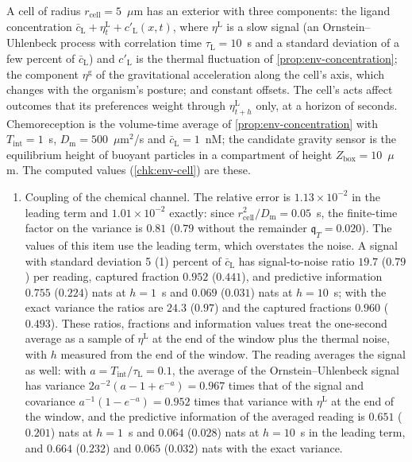 \begin{example}\label{ex:env-cell}
A cell of radius $r_{\mathrm{cell}}=5$~$\mu$m has an exterior with three components: the ligand concentration $\bar c_{\mathrm L}+\eta^{\mathrm L}_t+c'_{\mathrm L}(x,t)$, where $\eta^{\mathrm L}$ is a slow signal (an Ornstein--Uhlenbeck process with correlation time $\tau_{\mathrm L}=10$~s and a standard deviation of a few percent of $\bar c_{\mathrm L}$) and $c'_{\mathrm L}$ is the thermal fluctuation of \cref{prop:env-concentration}; the component $\eta^{\mathrm g}$ of the gravitational acceleration along the cell's axis, which changes with the organism's posture; and constant offsets. The cell's acts affect outcomes that its preferences weight through $\eta^{\mathrm L}_{t+h}$ only, at a horizon of seconds. Chemoreception is the volume-time average of \cref{prop:env-concentration} with $T_{\mathrm{int}}=1$~s, $D_{\mathrm m}=500$~$\mu$m$^2$/s and $\bar c_{\mathrm L}=1$~nM; the candidate gravity sensor is the equilibrium height of buoyant particles in a compartment of height $Z_{\mathrm{box}}=10$~$\mu$m. The computed values (\cref{chk:env-cell}) are these.
\begin{enumerate}
\item[(1)] Coupling of the chemical channel. The relative error is $1.13\times10^{-2}$ in the leading term and $1.01\times10^{-2}$ exactly: since $r_{\mathrm{cell}}^2/D_{\mathrm m}=0.05$~s, the finite-time factor on the variance is $0.81$ ($0.79$ without the remainder $\mathfrak q_T=0.020$). The values of this item use the leading term, which overstates the noise. A signal with standard deviation 5 (1) percent of $\bar c_{\mathrm L}$ has signal-to-noise ratio $19.7$ ($0.79$) per reading, captured fraction $0.952$ ($0.441$), and predictive information $0.755$ ($0.224$) nats at $h=1$~s and $0.069$ ($0.031$) nats at $h=10$~s; with the exact variance the ratios are $24.3$ ($0.97$) and the captured fractions $0.960$ ($0.493$). These ratios, fractions and information values treat the one-second average as a sample of $\eta^{\mathrm L}$ at the end of the window plus the thermal noise, with $h$ measured from the end of the window. The reading averages the signal as well: with $a=T_{\mathrm{int}}/\tau_{\mathrm L}=0.1$, the average of the Ornstein--Uhlenbeck signal has variance $2a^{-2}(a-1+e^{-a})=0.967$ times that of the signal and covariance $a^{-1}(1-e^{-a})=0.952$ times that variance with $\eta^{\mathrm L}$ at the end of the window, and the predictive information of the averaged reading is $0.651$ ($0.201$) nats at $h=1$~s and $0.064$ ($0.028$) nats at $h=10$~s in the leading term, and $0.664$ ($0.232$) and $0.065$ ($0.032$) nats with the exact variance.

\end{enumerate}
\end{example}
